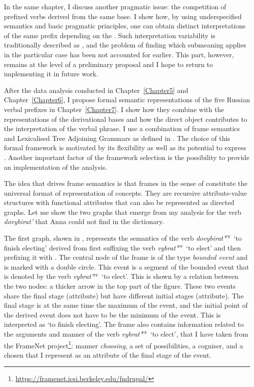 In the same chapter, I discuss another pragmatic issue: the competition of prefixed verbs derived from the same base. I show how, by using underspecified semantics and basic pragmatic principles, one can obtain distinct interpretations of the same prefix depending on the . Such interpretation variability is traditionally described as , and the problem of finding which submeaning applies in the particular case has been not accounted for earlier. This part, however, remains at the level of a preliminary proposal and I hope to return to implementing it in future work.

After the data analysis conducted in Chapter~\ref{Chapter5} and Chapter~\ref{Chapter6}, I propose formal semantic representations of the five Russian verbal prefixes in Chapter~\ref{Chapter7}. I show how they combine with the representations of the derivational bases and how the direct object contributes to the interpretation of the verbal phrase. I use a combination of frame semantics and Lexicalised Tree Adjoining Grammars as defined in \citealt{KallmeyerOsswald:13}. The choice of this formal framework is motivated by its flexibility as well as its potential to express . Another important factor of the framework selection is the possibility to provide an implementation of the analysis. 

The idea that drives frame semantics \citep{Loebner:2014} is that frames in the sense of \citet{Barsalou:92} constitute the universal format of representation of concepts. They are recursive attribute-value structures with functional attributes that can also be represented as directed graphs. Let me show the two graphs that emerge from my analysis for the verb \textit{dovybirat'} that Anna could not find in the dictionary.

The first graph, shown in , represents the semantics of the verb \textit{dovybirat'}$^{\textsc{pf}}$ `to finish electing' derived from first suffixing the verb \textit{vybrat'}$^{\textsc{pf}}$ `to elect' and then prefixing it with . The central node of the frame is of the type \textit{bounded event} and is marked with a double circle. This event is a segment of the bounded event that is denoted by the verb \textit{vybrat'}$^{\textsc{pf}}$ `to elect'. This is shown by a relation between the two nodes: a thicker arrow in the top part of the figure. These two events share the final stage (\FIN attribute) but have different initial stages (\INIT attribute). The final stage is at the same time the maximum of the event, and the initial point of the derived event does not have to be the minimum of the event. This is interpreted as `to finish electing'. The frame also contains information related to the arguments and manner of the verb \textit{vybrat'}$^{\textsc{pf}}$ `to elect', that I have taken from the FrameNet project\footnote{\url{https://framenet.icsi.berkeley.edu/fndrupal/}}: manner \textit{choosing}, a set of possibilities, a cogniser, and a chosen that I represent as an attribute of the final stage of the event.

